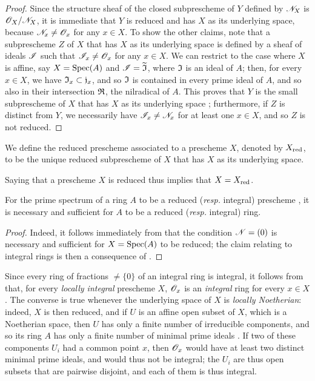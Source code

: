 \begin{proof}
\label{proof-1.5.1.2}
Since the structure sheaf of the closed subprescheme of $Y$ defined by $\mathscr{N}_X$ is $\mathscr{O}_X/\mathscr{N}_X$, it is immediate that $Y$ is reduced and has $X$ as its underlying space, because $\mathscr{N}_x\neq\mathscr{O}_x$ for any $x\in X$.
To show the other claims, note that a subprescheme $Z$ of $X$ that has $X$ as its underlying space is defined by a sheaf of ideals $\mathscr{I}$  such that $\mathscr{I}_x\neq\mathscr{O}_x$ for any $x\in X$.
We can restrict to the case where $X$ is affine, say $X={\mathop{\mathrm{Spec}}\nolimits}(A)$ and $\mathscr{I}={\widetilde{\mathfrak{I}}}$, where $\mathfrak{I}$ is an ideal of $A$;
then, for every $x\in X$, we have $\mathfrak{I}_x\subset\mathfrak{j}_x$, and so $\mathfrak{I}$ is contained in every prime ideal of $A$, and so also in their intersection $\mathfrak{R}$, the nilradical of $A$.
This proves that $Y$ is the small subprescheme of $X$ that has $X$ as its underlying space ;
furthermore, if $Z$ is distinct from $Y$, we necessarily have $\mathscr{I}_x\neq\mathscr{N}_x$ for at least one $x\in X$, and so  $Z$ is not reduced.
\end{proof}

\begin{defn}[5.1.3]
\label{1.5.1.3}
We define the reduced prescheme associated to a prescheme $X$, denoted by $X_{\mathrm{red}}$, to be the unique reduced subprescheme of $X$ that has $X$ as its underlying space.
\end{defn}

Saying that a prescheme $X$ is reduced thus implies that $X=X_{\mathrm{red}}$.

\begin{prop}[5.1.4]
\label{1.5.1.4}
For the prime spectrum of a ring $A$ to be a reduced (\emph{resp.} integral) prescheme , it is necessary and sufficient for $A$ to be a reduced (\emph{resp.} integral) ring.
\end{prop}

\begin{proof}
\label{proof-1.5.1.4}
Indeed, it follows immediately from  that the condition $\mathscr{N}=(0)$ is necessary and sufficient for $X={\mathop{\mathrm{Spec}}\nolimits}(A)$ to be reduced;
the claim relating to integral rings is then a consequence of .
\end{proof}

Since every ring of fractions $\neq\{0\}$ of an integral ring is integral, it follows from  that, for every \emph{locally integral} prescheme $X$, $\mathscr{O}_x$ is an \emph{integral} ring for every $x\in X$.
The converse is true whenever the underlying space of $X$ is \emph{locally Noetherian}:
indeed, $X$ is then reduced, and if $U$ is an affine open subset of $X$, which is a Noetherian space, then $U$ has only a finite number of irreducible components, and so its ring $A$ has only a finite number of minimal prime ideals .
If two of these components $U_i$ had a common point $x$, then $\mathscr{O}_x$ would have at least two distinct minimal prime ideals, and would thus not be integral;
the $U_i$ are thus open subsets that are pairwise disjoint, and each of them is thus integral.

